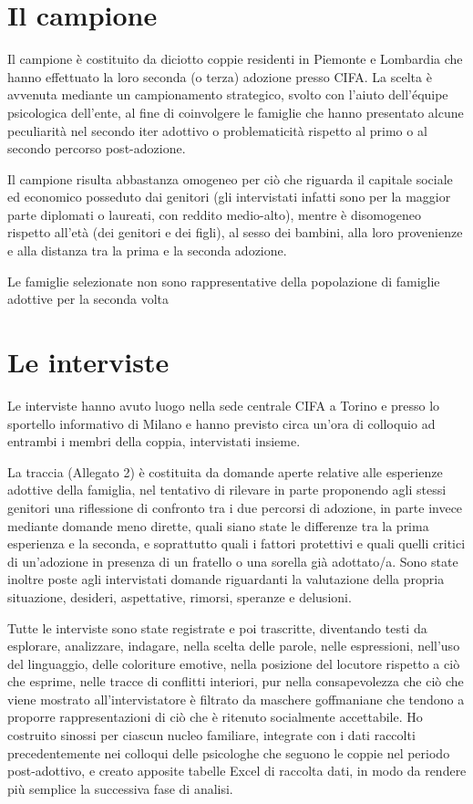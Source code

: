 \documentclass[12pt,oneside,svgnames]{memoir}
\begin{document}
\section{Il campione}\label{il-campione}

Il campione è costituito da diciotto coppie residenti in Piemonte e
Lombardia che hanno effettuato la loro seconda (o terza) adozione presso
CIFA. La scelta è avvenuta mediante un campionamento strategico, svolto
con l'aiuto dell'équipe psicologica dell'ente, al fine di coinvolgere le
famiglie che hanno presentato alcune peculiarità nel secondo iter
adottivo o problematicità rispetto al primo o al secondo percorso
post-adozione.

Il campione risulta abbastanza omogeneo per ciò che riguarda il capitale
sociale ed economico posseduto dai genitori (gli intervistati infatti
sono per la maggior parte diplomati o laureati, con reddito medio-alto),
mentre è disomogeneo rispetto all'età (dei genitori e dei figli), al
sesso dei bambini, alla loro provenienze e alla distanza tra la prima e
la seconda adozione.

Le famiglie selezionate non sono rappresentative della popolazione di
famiglie adottive per la seconda volta

\section{Le interviste}\label{le-interviste}

Le interviste hanno avuto luogo nella sede centrale CIFA a Torino e
presso lo sportello informativo di Milano e hanno previsto circa un'ora
di colloquio ad entrambi i membri della coppia, intervistati insieme.

La traccia (Allegato 2) è costituita da domande aperte relative alle
esperienze adottive della famiglia, nel tentativo di rilevare in parte
proponendo agli stessi genitori una riflessione di confronto tra i due
percorsi di adozione, in parte invece mediante domande meno dirette,
quali siano state le differenze tra la prima esperienza e la seconda, e
soprattutto quali i fattori protettivi e quali quelli critici di
un'adozione in presenza di un fratello o una sorella già adottato/a.
Sono state inoltre poste agli intervistati domande riguardanti la
valutazione della propria situazione, desideri, aspettative, rimorsi,
speranze e delusioni.

Tutte le interviste sono state registrate e poi trascritte, diventando
testi da esplorare, analizzare, indagare, nella scelta delle parole,
nelle espressioni, nell'uso del linguaggio, delle coloriture emotive,
nella posizione del locutore rispetto a ciò che esprime, nelle tracce di
conflitti interiori, pur nella consapevolezza che ciò che viene mostrato
all'intervistatore è filtrato da maschere goffmaniane che tendono a
proporre rappresentazioni di ciò che è ritenuto socialmente accettabile.
Ho costruito sinossi per ciascun nucleo familiare, integrate con i dati
raccolti precedentemente nei colloqui delle psicologhe che seguono le
coppie nel periodo post-adottivo, e creato apposite tabelle Excel di
raccolta dati, in modo da rendere più semplice la successiva fase di
analisi.
\end{document}
